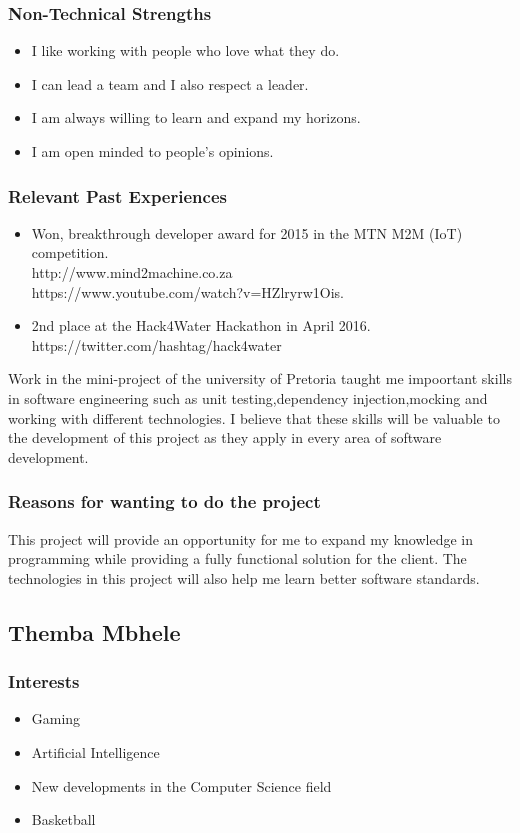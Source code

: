 \documentclass[a4paper,12pt]{article}
\begin{document}
\subsubsection{Non-Technical Strengths}
\begin{itemize}
\item I like working with people who love what they do.
\item I can lead a team and I also respect a leader.
\item I am always willing to learn and expand my horizons.
\item I am open minded to people's opinions.
\end{itemize}
\subsubsection{Relevant Past Experiences}
\begin{itemize}
\item Won, breakthrough developer award for 2015 in the MTN M2M (IoT) competition.\\
http://www.mind2machine.co.za \\
https://www.youtube.com/watch?v=HZlryrw1Ois.
\item 2nd place at the Hack4Water Hackathon in April 2016.\\
https://twitter.com/hashtag/hack4water
\end{itemize}
Work in the mini-project of the university of Pretoria taught me impoortant skills in software engineering such as unit testing,dependency injection,mocking and working with different technologies. I believe that these skills will be valuable to the development of this project as they apply in every area of software development.
\subsubsection{Reasons for wanting to do the project}
This project will provide an opportunity for me to expand my knowledge in programming while providing a fully functional solution for the client. The technologies in this project will also help me learn better software standards.
\subsection{Themba Mbhele}
\subsubsection{Interests}
\begin{itemize}
    \item Gaming
    \item Artificial Intelligence
    \item New developments in the Computer Science field
    \item Basketball
\end{itemize}
\end{document}
